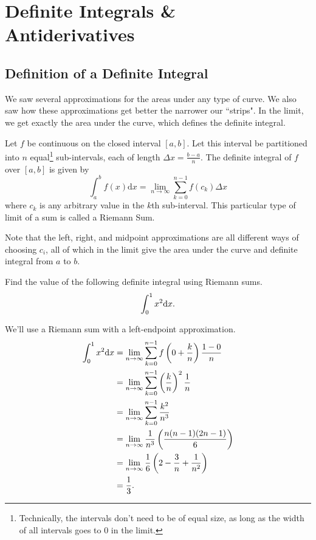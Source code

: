 \section{Definite Integrals \& Antiderivatives}

\subsection{Definition of a Definite Integral}
We saw several approximations for the areas under any type of curve.
We also saw how these approximations get better the narrower our ``strips".
In the limit, we get exactly the area under the curve, which defines the definite integral.

\begin{definition}
	Let $f$ be continuous on the closed interval $[a,b]$.
	Let this interval be partitioned into $n$ equal\footnote{Technically, the intervals don't need to be of equal size, as long as the width of all intervals goes to 0 in the limit.} sub-intervals, each of length $\Delta x = \frac{b-a}{n}$.
	The definite integral of $f$ over $[a,b]$ is given by
	\begin{equation*}
		\int_{a}^{b}{f(x)\mathrm{d}x} = \lim_{n\to \infty}{\sum_{k=0}^{n-1}{f(c_k)\Delta x}}
	\end{equation*}
	where $c_k$ is any arbitrary value in the $k$th sub-interval.
	This particular type of limit of a sum is called a Riemann Sum.
\end{definition}

Note that the left, right, and midpoint approximations are all different ways of choosing $c_i$, all of which in the limit give the area under the curve and definite integral from $a$ to $b$.

\begin{example}
	Find the value of the following definite integral using Riemann sums.
	\begin{equation*}
		\int_{0}^{1}{x^2\mathrm{d} x}.
	\end{equation*}
\end{example}
\begin{answer}
	We'll use a Riemann sum with a left-endpoint approximation.
	\begin{align*}
		\int_{0}^{1}{x^2\mathrm{d} x} &= \lim_{n\to\infty}{\sum_{k=0}^{n-1}{f\left(0+\frac{k}{n}\right)\frac{1-0}{n}}} \\
		&= \lim_{n\to\infty}{\sum_{k=0}^{n-1}{\left(\frac{k}{n}\right)^2\frac{1}{n}}} \\
		&= \lim_{n\to\infty}{\sum_{k=0}^{n-1}{\frac{k^2}{n^3}}} \\
		&= \lim_{n \to \infty}{\frac{1}{n^3}\left(\frac{n(n-1)(2n-1)}{6}\right)} \\
		&= \lim_{n\to\infty}{\frac{1}{6}\left(2-\frac{3}{n}+\frac{1}{n^2}\right)} \\
		&= \frac{1}{3}.
	\end{align*}
\end{answer}


